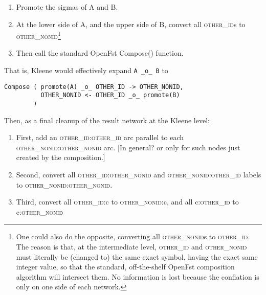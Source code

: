 \documentclass[letterpaper,11pt]{article}
\providecommand{\acro}{}\renewcommand{\acro}{\textsc}
\begin{document}
\begin{samepage}
\begin{enumerate}

\item
Promote the sigmas of A and B.

\item
At the lower side of A, and the upper side of B, convert all
\acro{other\_id}s to \acro{other\_nonid}\footnote{One could also do the opposite,
converting all \acro{other\_nonid}s to \acro{other\_id}.  The reason is that, at the intermediate level,
\acro{other\_id} and \acro{other\_nonid} must literally be (changed to) the same exact symbol,
having the exact same integer value, so that the standard, off-the-shelf
OpenFst composition algorithm will intersect them.  No information is lost
because the conflation is only
on one side of each network.}

\item
Then call the standard OpenFst Compose() function.

\end{enumerate}
\end{samepage}

\noindent
That is, Kleene would effectively expand \texttt{A~\_o\_~B} to

\begin{Verbatim}[fontsize=\small]
Compose ( promote(A) _o_ OTHER_ID -> OTHER_NONID,
          OTHER_NONID <- OTHER_ID _o_ promote(B)
        )
\end{Verbatim}

\noindent
\begin{samepage}
Then, as a final cleanup of the result network at the Kleene level:

\begin{enumerate}

\item
First, add an \acro{other\_id}:\acro{other\_id} arc parallel to each
\acro{other\_nonid}:\acro{other\_nonid} arc.  [In general? or only for such nodes just created by the
composition.]

\item
Second, convert all \acro{other\_id}:\acro{other\_nonid} and \acro{other\_nonid}:\acro{other\_id} labels to \acro{other\_nonid}:\acro{other\_nonid}.

\item
Third, convert all \acro{other\_id}:c to \acro{other\_nonid}:c, and all c:\acro{other\_id} to
c:\acro{other\_nonid}

\end{enumerate}
\end{samepage}
\end{document}
